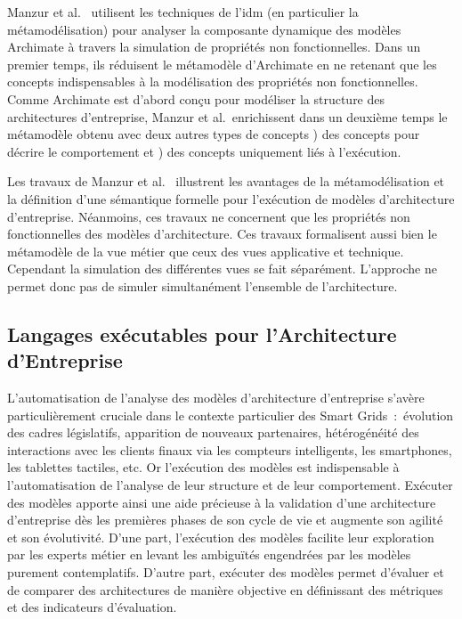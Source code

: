 Manzur et al.~\cite{manzur2015xarchimate} utilisent les techniques de l'\gls{idm} (en particulier la métamodélisation) pour analyser la composante dynamique des modèles Archimate à travers la simulation de propriétés non fonctionnelles. Dans un premier temps, ils réduisent le métamodèle  d'Archimate en ne retenant que les concepts indispensables à la modélisation des propriétés non fonctionnelles. Comme Archimate est d'abord conçu pour modéliser la structure des architectures d'entreprise, Manzur et al.~enrichissent dans un deuxième temps le métamodèle obtenu avec deux autres types de concepts \primo\!) des concepts pour décrire le comportement et \secundo\!) des concepts uniquement liés à l'exécution. 

Les travaux de Manzur et al.~\cite{manzur2015xarchimate} illustrent les avantages de la métamodélisation et la définition d'une sémantique formelle pour l'exécution de modèles d'architecture d'entreprise. Néanmoins, ces travaux ne concernent que les propriétés non fonctionnelles des modèles d'architecture. Ces travaux formalisent aussi bien le métamodèle de la vue métier que ceux des vues applicative et technique. Cependant la simulation des différentes vues se fait séparément. L'approche ne permet donc pas de simuler simultanément l'ensemble de l'architecture. 



\subsection{Langages exécutables pour l'Architecture d'Entreprise}
\label{sec:executables_languages_ea}

L'automatisation de l'analyse des modèles d'architecture d'entreprise s'avère particulièrement cruciale dans le contexte particulier des Smart Grids~:~évolution des cadres législatifs,  apparition de nouveaux partenaires, hétérogénéité des interactions avec les clients finaux via les compteurs intelligents, les smartphones, les tablettes tactiles, etc. Or l'exécution des modèles est indispensable à l'automatisation de l'analyse de leur structure et de leur comportement. Exécuter des modèles apporte ainsi une aide précieuse à la validation d'une architecture d'entreprise dès les premières phases de son cycle de vie et augmente son agilité et son évolutivité. D'une part, l'exécution des modèles facilite leur exploration  par les experts métier en levant les ambiguïtés engendrées par les modèles purement contemplatifs. D'autre part, exécuter des modèles permet d'évaluer et de comparer des architectures de manière objective en définissant des métriques et des indicateurs d'évaluation. 


